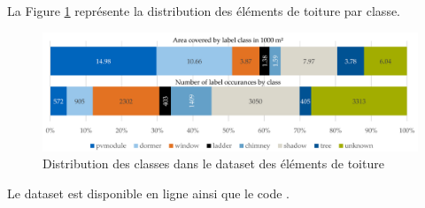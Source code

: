 {{{{\par{La Figure \ref{fig:rid_dataset_distribution_classes} représente la distribution des éléments de toiture par classe.}
\begin{figure}[H]
    \centering
    \includegraphics[width=1\linewidth]{02-main//figures/rid_dataset_distribution_classes.png}
    \caption{Distribution des classes dans le dataset des éléments de toiture \cite{krapf_ridroof_2022}}
    \label{fig:rid_dataset_distribution_classes}
\end{figure}
\par{Le dataset est disponible en ligne \cite{krapf_rid_2021} ainsi que le code \cite{krapf_tumftmrid_2025}.}

}}}}
